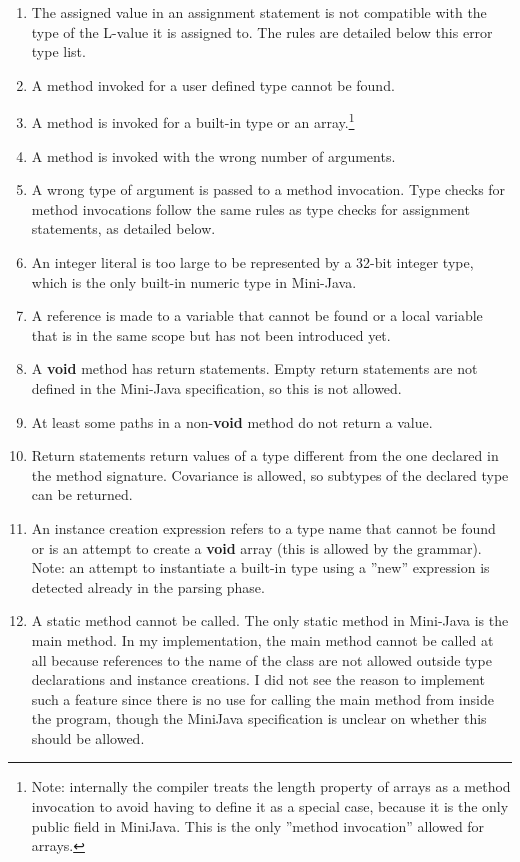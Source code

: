 \documentclass[a4paper,11pt]{article}
\begin{document}
\begin{enumerate}
\item The assigned value in an assignment statement is not compatible with the type of the L-value it is assigned to. The rules are detailed below this error type list.
\item A method invoked for a user defined type cannot be found.
\item A method is invoked for a built-in type or an array.\footnote{Note: internally the compiler treats the length property of arrays as a method invocation to avoid having to define it as a special case, because it is the only public field in MiniJava. This is the only ''method invocation'' allowed for arrays.}
\item A method is invoked with the wrong number of arguments.
\item A wrong type of argument is passed to a method invocation. Type checks for method invocations follow the same rules as type checks for assignment statements, as detailed below.
\item An integer literal is too large to be represented by a 32-bit integer type, which is the only built-in numeric type in Mini-Java.
\item A reference is made to a variable that cannot be found or a local variable that is in the same scope but has not been introduced yet.
\item A \textbf{void} method has return statements. Empty return statements are not defined in the Mini-Java specification, so this is not allowed.
\item At least some paths in a non-\textbf{void} method do not return a value.
\item Return statements return values of a type different from the one declared in the method signature. Covariance is allowed, so subtypes of the declared type can be returned.
\item An instance creation expression refers to a type name that cannot be found or is an attempt to create a \textbf{void} array (this is allowed by the grammar). Note: an attempt to instantiate a built-in type using a ''new'' expression is detected already in the parsing phase.
\item A static method cannot be called. The only static method in Mini-Java is the main method. In my implementation, the main method cannot be called at all because references to the name of the class are not allowed outside type declarations and instance creations. I did not see the reason to implement such a feature since there is no use for calling the main method from inside the program, though the MiniJava specification is unclear on whether this should be allowed.
\end{enumerate}
\end{document}
